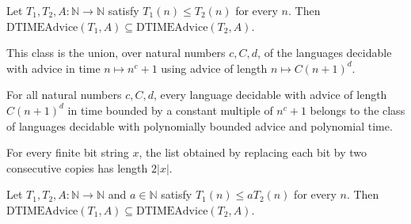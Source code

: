 \begin{theorem}
\label{Complexity.DTIMEAdvice.mono}
\leanok
{}
Let $T_1,T_2,A : \mathbb{N} \to \mathbb{N}$ satisfy $T_1(n) \le T_2(n)$ for every $n$.
Then $\mathrm{DTIMEAdvice}(T_1,A) \subseteq \mathrm{DTIMEAdvice}(T_2,A)$.
\end{theorem}

\begin{definition}
\label{Complexity.PAdvicePoly}
\leanok
{}
This class is the union, over natural numbers $c,C,d$, of the languages decidable with
advice in time $n\mapsto n^c+1$ using advice of length $n\mapsto C(n+1)^d$.
\end{definition}

\begin{theorem}
\label{Complexity.DTIMEAdvice_subset_PAdvicePoly}
\leanok
{}
For all natural numbers $c,C,d$, every language decidable with advice of length
$C(n+1)^d$ in time bounded by a constant multiple of $n^c+1$ belongs to the class of
languages decidable with polynomially bounded advice and polynomial time.
\end{theorem}

\begin{lemma}
\label{Complexity.length_doubled}
\leanok
{}
For every finite bit string $x$, the list obtained by replacing each bit by two
consecutive copies has length $2|x|$.
\end{lemma}

\begin{theorem}
\label{Complexity.DTIMEAdvice.mono_const}
\leanok
{}
Let $T_1,T_2,A : \mathbb{N} \to \mathbb{N}$ and $a \in \mathbb{N}$ satisfy $T_1(n) \le a
T_2(n)$ for every $n$. Then $\mathrm{DTIMEAdvice}(T_1,A) \subseteq
\mathrm{DTIMEAdvice}(T_2,A)$.
\end{theorem}

